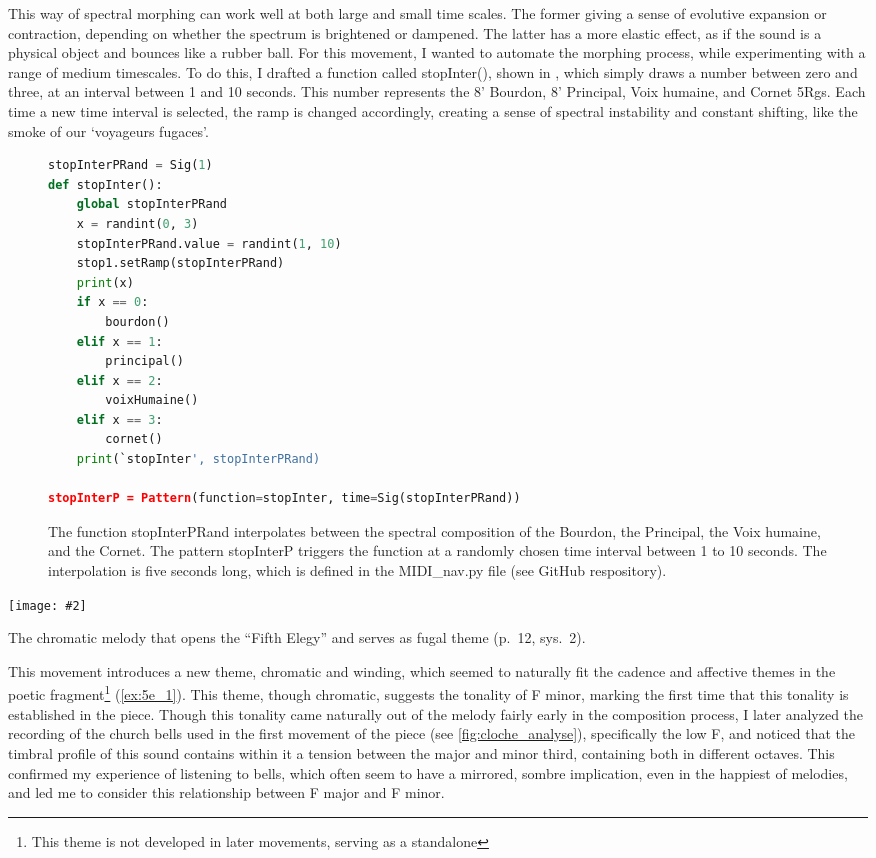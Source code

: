 \documentclass[12pt,twoside,maitrise]{dms_ks}
\newcommand{\customincludeexamples}[4][]{%
    \begin{example}[H]
        \centering
        \texttt{[image: \#2]}
        \caption{#4}
	\label{#3} 
    \end{example}
}
\theoremstyle{definition}
\begin{document}
{This way of spectral morphing can work well at both large and small time scales.
The former giving a sense of evolutive expansion or contraction, depending on whether the spectrum is brightened or dampened.
The latter has a more elastic effect, as if the sound is a physical object and bounces like a rubber ball.
For this movement, I wanted to automate the morphing process, while experimenting with a range of medium timescales.
To do this, I drafted a function called stopInter(), shown in , which simply draws a number between zero and three, at an interval between 1 and 10 seconds.
This number represents the 8' Bourdon, 8' Principal, Voix humaine, and Cornet 5Rgs.
Each time a new time interval is selected, the ramp is changed accordingly, creating a sense of spectral instability and constant shifting, like the smoke of our `voyageurs fugaces'.
\begin{figure}[H]
\begin{lstlisting}[language=Python]
stopInterPRand = Sig(1)
def stopInter():
    global stopInterPRand
    x = randint(0, 3)
    stopInterPRand.value = randint(1, 10)
    stop1.setRamp(stopInterPRand)
    print(x)
    if x == 0:
        bourdon()
    elif x == 1:
        principal()
    elif x == 2:
        voixHumaine()
    elif x == 3:
        cornet()
    print(`stopInter', stopInterPRand)

stopInterP = Pattern(function=stopInter, time=Sig(stopInterPRand))
\end{lstlisting}
\caption{The function stopInterPRand interpolates between the spectral composition of the Bourdon, the Principal, the Voix humaine, and the Cornet. The pattern stopInterP triggers the function at a randomly chosen time interval between 1 to 10 seconds. The interpolation is five seconds long, which is defined in the MIDI\_nav.py file (see GitHub respository).}
\label{fig:stopinter}
\end{figure}

\customincludeexamples[width=\textwidth]{5e_1}{ex:5e_1}{The chromatic melody that opens the “Fifth Elegy” and serves as fugal theme (p.~12, sys.~2).}

This movement introduces a new theme, chromatic and winding, which seemed to naturally fit the cadence and affective themes in the poetic fragment\footnote{This theme is not developed in later movements, serving as a standalone} (\cref{ex:5e_1}).
This theme, though chromatic, suggests the tonality of F minor, marking the first time that this tonality is established in the piece.
Though this tonality came naturally out of the melody fairly early in the composition process, I later analyzed the recording of the church bells used in the first movement of the piece (see \cref{fig:cloche_analyse}), specifically the low F, and noticed that the timbral profile of this sound contains within it a tension between the major and minor third, containing both in different octaves.
This confirmed my experience of listening to bells, which often seem to have a mirrored, sombre implication, even in the happiest of melodies, and led me to consider this relationship between F major and F minor. 

}
\end{document}
